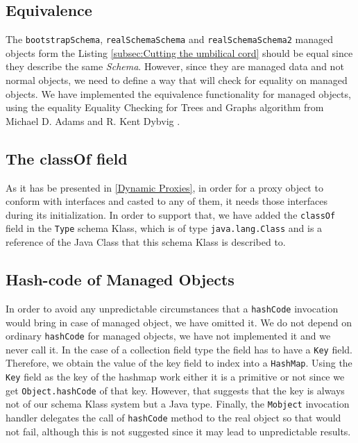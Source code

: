 \subsection{Equivalence}\label{Managed Object equivalence}
The \texttt{bootstrapSchema}, \texttt{realSchemaSchema} and \texttt{realSchemaSchema2} managed objects form the Listing \ref{subsec:Cutting the umbilical cord} should be equal since they describe the same \textit{Schema}.
However, since they are managed data and not normal objects, we need to define a way that will check for equality on managed objects.
We have implemented the equivalence functionality for managed objects, using the equality Equality Checking for Trees and Graphs
algorithm from Michael D. Adams and R. Kent Dybvig \cite{adams2008efficient}.

\subsection{The classOf field}\label{The classOf field}
As it has be presented in \ref{Dynamic Proxies}, in order for a proxy object to conform with interfaces and casted to any of them, it needs those interfaces during its initialization.
In order to support that, we have added the \texttt{classOf} field in the \texttt{Type} schema Klass, which is of type \texttt{java.lang.Class} and is a reference of the Java Class that this schema Klass is described to.

\subsection{Hash-code of Managed Objects}\label{Hashcode of Managed Objects}
In order to avoid any unpredictable circumstances that a \texttt{hashCode} invocation would bring in case of managed object, we have omitted it. 
We do not depend on ordinary \texttt{hashCode} for managed objects, we have not implemented it and we never call it. 
In the case of a collection field type the field has to have a \texttt{Key} field.
Therefore, we obtain the value of the key field to index into a \texttt{HashMap}. 
Using the \texttt{Key} field as the key of the hashmap work either it is a primitive or not since we get \texttt{Object.hashCode} of that key.
However, that suggests that the key is always not of our schema Klass system but a Java type.
Finally, the \texttt{Mobject} invocation handler delegates the call of \texttt{hashCode} method to the real object so that would not fail, although this is not suggested since it may lead to unpredictable results.

